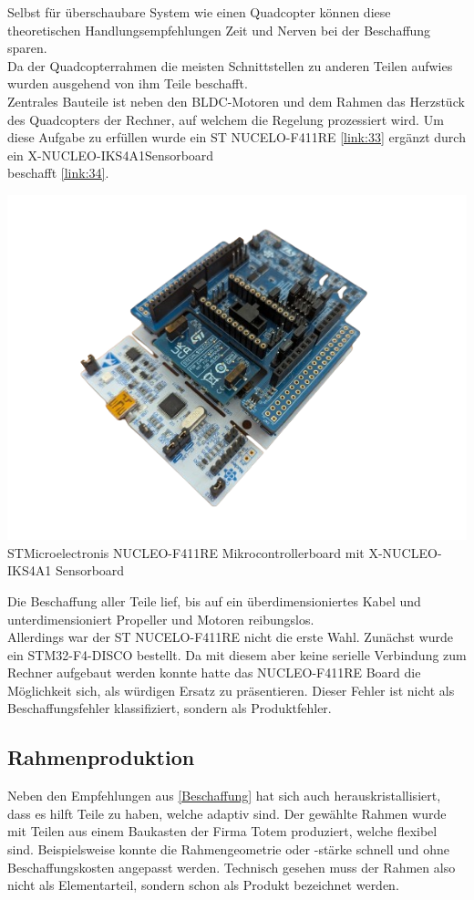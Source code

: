 Selbst für überschaubare System wie einen Quadcopter können diese theoretischen Handlungsempfehlungen Zeit und Nerven bei der Beschaffung sparen.\\
Da der Quadcopterrahmen die meisten Schnittstellen zu anderen Teilen aufwies wurden ausgehend von ihm Teile beschafft.\\
Zentrales Bauteile ist neben den BLDC-Motoren und dem Rahmen das Herzstück des Quadcopters der Rechner, auf welchem die Regelung prozessiert wird.
Um diese Aufgabe zu erfüllen wurde ein ST NUCELO-F411RE \ref{link:33} ergänzt durch ein X-NUCLEO-IKS4A1Sensorboard\\ beschafft \ref{link:34}.
\begin{center}
\includegraphics[scale=0.6]{../images/0002 nucleo-f411re.png}{\\STMicroelectronis NUCLEO-F411RE Mikrocontrollerboard mit X-NUCLEO-IKS4A1 Sensorboard}
\end{center}
Die Beschaffung aller Teile lief, bis auf ein überdimensioniertes Kabel und unterdimensioniert Propeller und Motoren reibungslos.\\
Allerdings war der ST NUCELO-F411RE nicht die erste Wahl. Zunächst wurde ein STM32-F4-DISCO bestellt. Da mit diesem aber keine serielle Verbindung zum Rechner aufgebaut werden konnte hatte das NUCLEO-F411RE Board die Möglichkeit sich, als würdigen Ersatz zu präsentieren. Dieser Fehler ist nicht als Beschaffungsfehler klassifiziert, sondern als Produktfehler.
\subsection{Rahmenproduktion}
Neben den Empfehlungen aus \ref{Beschaffung} hat sich auch herauskristallisiert, dass es hilft Teile zu haben, welche adaptiv sind. Der gewählte Rahmen wurde mit Teilen aus einem Baukasten der Firma Totem produziert, welche flexibel sind. Beispielsweise konnte die Rahmengeometrie oder -stärke schnell und ohne Beschaffungskosten angepasst werden. Technisch gesehen muss der Rahmen also nicht als Elementarteil, sondern schon als Produkt bezeichnet werden.
